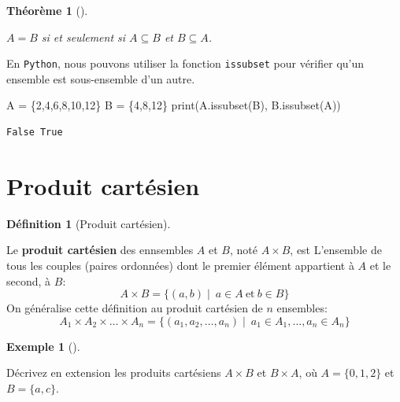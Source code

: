 \documentclass[
  letterpaper,
]{scrbook}
\newenvironment{Shaded}{\begin{snugshade}}{\end{snugshade}}
\newcommand{\BuiltInTok}[1]{\textcolor[rgb]{0.00,0.50,0.00}{#1}}
\newcommand{\DecValTok}[1]{\textcolor[rgb]{0.25,0.63,0.44}{#1}}
\newcommand{\NormalTok}[1]{\textcolor[rgb]{0.00,0.44,0.13}{#1}}
\newcommand{\OperatorTok}[1]{\textcolor[rgb]{0.40,0.40,0.40}{#1}}
\newcommand{\set}[1]{\{#1\}}
\theoremstyle{plain}
\newtheorem{theorem}{Théorème}[chapter]
\theoremstyle{definition}
\newtheorem{definition}{Définition}[chapter]
\theoremstyle{definition}
\newtheorem{example}{Exemple}[chapter]
\theoremstyle{remark}
\begin{document}
\begin{theorem}[]\protect\hypertarget{thm-sous-ensemble-egalite-ensemble}{}\label{thm-sous-ensemble-egalite-ensemble}

\(A=B\) si et seulement si \(A\subseteq B\) et \(B\subseteq A\).

\end{theorem}

En \texttt{Python}, nous pouvons utiliser la fonction \texttt{issubset}
pour vérifier qu'un ensemble est sous-ensemble d'un autre.

\hypertarget{sous-ensemble-verification}{}
\begin{Shaded}
\begin{Highlighting}[]
\NormalTok{A }\OperatorTok{=}\NormalTok{ \{}\DecValTok{2}\NormalTok{,}\DecValTok{4}\NormalTok{,}\DecValTok{6}\NormalTok{,}\DecValTok{8}\NormalTok{,}\DecValTok{10}\NormalTok{,}\DecValTok{12}\NormalTok{\}}
\NormalTok{B }\OperatorTok{=}\NormalTok{ \{}\DecValTok{4}\NormalTok{,}\DecValTok{8}\NormalTok{,}\DecValTok{12}\NormalTok{\}}
\BuiltInTok{print}\NormalTok{(A.issubset(B), B.issubset(A))}
\end{Highlighting}
\end{Shaded}

\begin{verbatim}
False True
\end{verbatim}

\hypertarget{produit-cartuxe9sien}{%
\section{Produit cartésien}\label{produit-cartuxe9sien}}

\begin{definition}[Produit
cartésien]\protect\hypertarget{def-produit-cartesien}{}\label{def-produit-cartesien}

Le \textbf{produit cartésien} des ennsembles \(A\) et \(B\), noté
\(A\times B\), est L'ensemble de tous les couples (paires ordonnées)
dont le premier élément appartient à \(A\) et le second, à \(B\): \[
A\times B = \set{(a,b)\mid\ a\in A\ \text{et}\ b\in B}
\] On généralise cette définition au produit cartésien de \(n\)
ensembles: \[
A_1 \times A_2 \times \ldots \times A_n = \set{(a_1,a_2,\ldots,a_n)\mid\ a_1\in A_1,\ldots, a_n\in A_n}
\]

\end{definition}

\begin{example}[]\protect\hypertarget{exm-ensembles-extension-produit-cartesien}{}\label{exm-ensembles-extension-produit-cartesien}

Décrivez en extension les produits cartésiens \(A\times B\) et
\(B\times A\), où \(A=\set{0,1,2}\) et \(B=\set{a,c}\).

\end{example}
\end{document}
